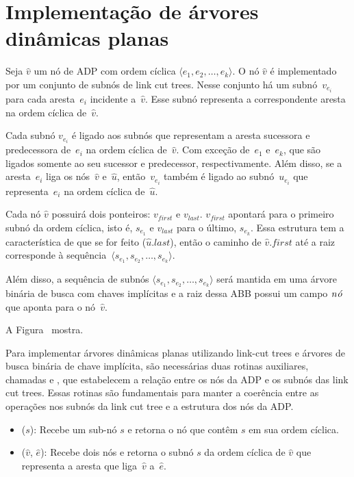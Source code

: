 \section{Implementação de árvores dinâmicas planas}


Seja $\hat v$ um nó de ADP com ordem cíclica $\langle e_1, e_2, \ldots, e_k\rangle$.
O nó $\hat v$ é implementado por um conjunto de subnós de link cut trees.
Nesse conjunto há um subnó~$v_{e_i}$ para cada aresta~$e_i$ incidente a~$\hat v$.
Esse subnó representa a correspondente aresta na ordem cíclica de~$\hat v$.

Cada subnó $v_{e_i}$ é ligado aos subnós que representam a aresta sucessora e predecessora de~$e_i$ na ordem cíclica de~$\hat v$.
Com exceção de~$e_1$ e~$e_k$, que são ligados somente ao seu sucessor e predecessor, respectivamente.
Além disso, se a aresta~$e_i$ liga os nós~$\hat v$ e~$\hat u$, então~$v_{e_i}$ também é ligado ao subnó~$u_{e_i}$ que representa~$e_i$ na ordem cíclica de~$\hat u$.

Cada nó $\hat v$ possuirá dois ponteiros: $v_{first}$ e $v_{last}$.
$v_{first}$ apontará para o primeiro subnó da ordem cíclica, isto é, $s_{e_1}$ e $v_{last}$ para o último, $s_{e_k}$.
Essa estrutura tem a característica de que se for feito \linkcutEvert($\hat u$.$last$), então o caminho de $\hat v$.$first$ até a raiz corresponde à sequência~$\langle s_{e_1}, s_{e_2}, \ldots, s_{e_k}\rangle$.

Além disso, a sequência de subnós $\langle s_{e_1}, s_{e_2}, \ldots, s_{e_k}\rangle$ será mantida em uma árvore binária de busca com chaves implícitas e a raiz dessa ABB possui um campo $\mathit{n\acute{o}}$ que aponta para o nó~$\hat v$.

A Figura~ mostra.

Para implementar árvores dinâmicas planas utilizando link-cut trees e árvores de busca binária de chave implícita, são necessárias duas rotinas auxiliares, chamadas \LCOFindNode{} e \LCOFindSubNode{}, que estabelecem a relação entre os nós da ADP e os subnós das link cut trees.
Essas rotinas são fundamentais para manter a coerência entre as operações nos subnós da link cut tree e a estrutura dos nós da ADP.

\begin{itemize}
\item \LCOFindNode($s$): Recebe um sub-nó $s$ e retorna o nó que contêm $s$ em sua ordem cíclica.
\item \LCOFindSubNode($\hat v$, $\hat e$): Recebe dois nós e retorna o subnó $s$ da ordem cíclica de $\hat v$ que representa a aresta que liga~$\hat v$ a~$\hat e$.
\end{itemize}



